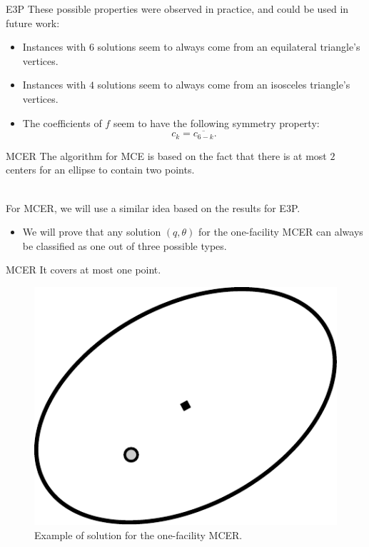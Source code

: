 \documentclass{beamer}
\theoremstyle{definition}
\begin{document}
\begin{frame}{E3P}
	These possible properties were observed in practice, and could be used in future work:
	\begin{itemize}
		\item Instances with $6$ solutions seem to always come from an equilateral triangle's vertices.
		\item Instances with $4$ solutions seem to always come from an isosceles triangle's vertices.
		\item The coefficients of $f$ seem to have the following symmetry property:
		\begin{equation*}
		c_k = \overline{c_{6-k}}.
		\end{equation*}
	\end{itemize}
\end{frame}

\begin{frame}{MCER}
	The algorithm for MCE is based on the fact that there is at most $2$ centers for an ellipse to contain two points.
	\\~\
	
	For MCER, we will use a similar idea based on the results for E3P.
	
	\begin{itemize}
		\item We will prove that any solution $(q,\theta)$ for the one-facility MCER can always be classified as one out of three possible types.
	\end{itemize}
\end{frame}

\begin{frame}{MCER}
	It covers at most one point.
	\begin{figure}
		\centering
		\includegraphics[scale=.6]{figures/mcer3}
		\caption{Example of solution for the one-facility MCER.}
	\end{figure}
\end{frame}
\end{document}
